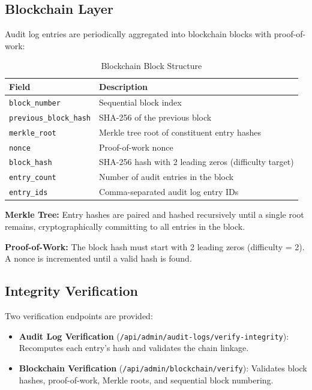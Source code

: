 \documentclass[12pt,a4paper]{article}
\begin{document}
\subsection{Blockchain Layer}
Audit log entries are periodically aggregated into blockchain blocks with proof-of-work:

\begin{table}[H]
\centering
\begin{tabular}{ll}
\toprule
\textbf{Field} & \textbf{Description} \\
\midrule
\texttt{block\_number} & Sequential block index \\
\texttt{previous\_block\_hash} & SHA-256 of the previous block \\
\texttt{merkle\_root} & Merkle tree root of constituent entry hashes \\
\texttt{nonce} & Proof-of-work nonce \\
\texttt{block\_hash} & SHA-256 hash with 2 leading zeros (difficulty target) \\
\texttt{entry\_count} & Number of audit entries in the block \\
\texttt{entry\_ids} & Comma-separated audit log entry IDs \\
\bottomrule
\end{tabular}
\caption{Blockchain Block Structure}
\end{table}

\textbf{Merkle Tree:} Entry hashes are paired and hashed recursively until a single root remains, cryptographically committing to all entries in the block.

\textbf{Proof-of-Work:} The block hash must start with 2 leading zeros (difficulty = 2). A nonce is incremented until a valid hash is found.

\subsection{Integrity Verification}
Two verification endpoints are provided:
\begin{itemize}
  \item \textbf{Audit Log Verification} (\texttt{/api/admin/audit-logs/verify-integrity}): Recomputes each entry's hash and validates the chain linkage.
  \item \textbf{Blockchain Verification} (\texttt{/api/admin/blockchain/verify}): Validates block hashes, proof-of-work, Merkle roots, and sequential block numbering.
\end{itemize}
\end{document}
